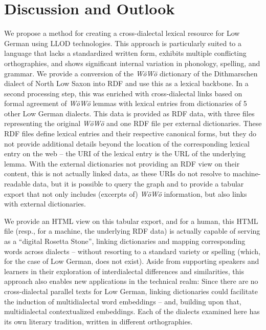 \section{Discussion and Outlook}

We propose a method for creating a cross-dialectal lexical resource for Low German using LLOD technologies. This approach is particularly suited to a language that lacks a standardized written form, exhibits multiple conflicting orthographies, and shows significant internal variation in phonology, spelling, and grammar. 
We provide a conversion of the \emph{WöWö} dictionary of the Dithmarschen dialect of North Low Saxon into RDF and use this as a lexical backbone. In a second processing step, this was enriched with cross-dialectal links based on formal agreement of \emph{WöWö} lemmas with lexical entries from dictionaries of 5 other Low German dialects.
This data is provided as RDF data, with three files representing the original \emph{WöWö} and one RDF file per external dictionaries. These RDF files define lexical entries and their respective canonical forms, but they do not provide additional details beyond the location of the corresponding lexical entry on the web -- the URI of the lexical entry is the URL of the underlying lemma. With the external dictionaries not providing an RDF view on their content, this is not actually linked data, as these URIs do not resolve to machine-readable data, but it is possible to query the graph and to provide a tabular export that not only includes (excerpts of) \emph{WöWö} information, but also links with external dictionaries.

We provide an HTML view on this tabular export, and for a human, this HTML file (resp., for a machine, the underlying RDF data) is actually capable of serving as a ``digital Rosetta Stone'', linking dictionaries and mapping corresponding words across dialects -- without resorting to a standard variety or spelling (which, for the case of Low German, does not exist). 
Aside from supporting speakers and learners in their exploration of interdialectal differences and similarities, this approach also enables new applications in the technical realm: Since there are no cross-dialectal parallel texts for Low German, linking dictionaries could facilitate the induction of multidialectal word embeddings -- and, building upon that, multidialectal contextualized embeddings. Each of the dialects examined here has its own literary tradition, written in different orthographies.

